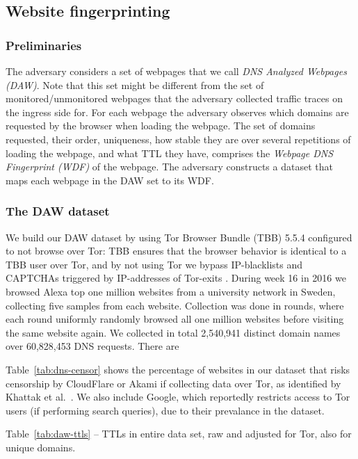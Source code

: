 \subsection{Website fingerprinting}

\subsubsection{Preliminaries}
The adversary considers a set of webpages that we call \emph{DNS
Analyzed Webpages (DAW)}. Note that this set might be different from the
set of monitored/unmonitored webpages that the adversary collected
traffic traces on the ingress side for.
For each webpage the adversary observes which domains are requested by
the browser when loading the webpage. The set of domains requested,
their order, uniqueness, how stable they are over several repetitions of
loading the webpage, and what TTL they have, comprises the
\emph{Webpage DNS Fingerprint (WDF)} of the webpage.
The adversary constructs a dataset that maps each webpage in the DAW set
to its WDF.

\subsubsection{The DAW dataset}
We build our DAW dataset by using Tor Browser Bundle (TBB) 5.5.4
configured to not browse over Tor: TBB ensures that the browser behavior is
identical to a TBB user over Tor, and by not using Tor we bypass IP-blacklists
and CAPTCHAs triggered by IP-addresses of Tor-exits \cite{Khattak2016a}.
During week 16 in 2016 we browsed Alexa top one million websites from a
university network in Sweden, collecting five samples from each website.
Collection was done in rounds, where each round uniformly randomly browsed all one
million websites before visiting the same website again. We collected in total
2,540,941 distinct domain names over 60,828,453 DNS requests. There are

Table~\ref{tab:dns-censor} shows the percentage of websites in our dataset that
risks censorship by CloudFlare or Akami if collecting data over Tor, as
identified by Khattak et al.~\cite{Khattak2016a}. We also include Google, which
reportedly restricts access to Tor users (if performing search queries), due to
their prevalance in the dataset.

Table~\ref{tab:daw-ttls} -- TTLs in entire data set, raw and adjusted for Tor,
also for unique domains.

